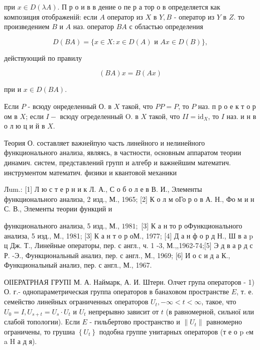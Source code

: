 \documentclass[10pt]{article}
\begin{document}
при $x \in D(\lambda A)$. П р о и в в дение о пе р а тор о в определяется как композиция отображеній: если $A$ оператор из $X$ в $Y, B$ - оператор из $Y$ в $Z$. то произведением $B$ и $A$ наз. оператор $B A$ с областью определения



\[

D(B A)=\{x \in X: x \in D(A) \text { и } A x \in D(B)\},

\]



действующий по правилу



\[

(B A) x=B(A x)

\]



при и $x \in D(B A)$.



Если $P$ - всюду онределенный О. в $X$ такой, что $P P=P$, то $P$ наз. п р о е к т о р ом в $X$; если $I-$ всюду огределенный $\mathrm{O}$. в $X$ такой, что $I I=\mathrm{id}_{X}$, то $I$ наз. и н в о л ю ц и й в $X$.



Теория О. составляет важнейпую часть линейного и нелинейного функционального анализа, являясь, в частности, основным аппаратом теории динамич. систем, представлений групп и алгебр и важнейшим математич. инструментом математич. физики и квантовой механики



Лum.: [1] Л ю с т е р н и к Л. А., С о б о л е в В. И., Элементы функционального анализа, 2 изд., М., 1965; [2] К о л м оГо р о в А. Н., Фо м и н С. В., Элементы теории функций и

функционального анализа, 5 изд., М., $1981 ;$ [3] К а н то р оФункционального анализа, 5 изд., М., 1981; [3] К а н т о р оМ., 1977; [4] Д а н ф о р д Н., Ш в а p ц Дж. Т., Линейные операторы, пер. с англ., ч. 1 -3, М.,,1962-74;[5] Э д в а р д с Р. -Э., Функциональный анализ, пер. с англ., М., 1969; [6] И о с и д а К., Функциональный анализ, пер. с англ., М., 1967.



ОІІЕРАТРНАЯ ГРУПI М. А. Наймарк, А. И. Штерн. Олчет група операторов - 1) О. г.- однопараметрическая группа операторов в банаховом пространстве $E$, т. е. семейство линейных ограниченных операторов $U_{t},-\infty<t<\infty$, такое, что $U_{0}=I, U_{s+t}=U_{s} \cdot U_{t}$ и $U_{t}$ непрерывно зависит от $t$ (в равномерной, сильної или слабой топологии). Если $E$ - гильбертово пространство и $\left\|U_{t}\right\|$ равномерно ограничены, то грушиа $\left\{U_{t}\right\}$ подобна группе унитарных операторов (т е о p eм a H а д я).
\end{document}
